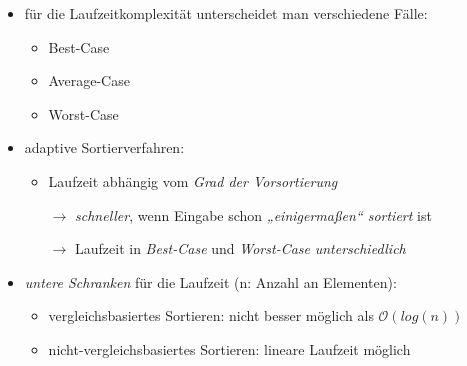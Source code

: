 \documentclass{lehramt-informatik}
\begin{document}
 \cite[Seite 38]{aud:fs:tafeluebung-11}

\begin{itemize}

%

\item für die Laufzeitkomplexität unterscheidet man verschiedene Fälle:

\begin{itemize}
\item Best-Case
\item Average-Case
\item Worst-Case
\end{itemize}

%

\item adaptive Sortierverfahren:

\begin{itemize}
\item Laufzeit abhängig vom \emph{Grad der Vorsortierung}

$\rightarrow$ \emph{schneller}, wenn Eingabe schon \emph{„einigermaßen“
sortiert} ist

$\rightarrow$ Laufzeit in \emph{Best-Case} und \emph{Worst-Case}
\emph{unterschiedlich}

\end{itemize}

%

\item \emph{untere Schranken} für die Laufzeit (n: Anzahl an Elementen):

\begin{itemize}
\item vergleichsbasiertes Sortieren: nicht besser möglich als
$\mathcal{O}(log(n))$
\item nicht-vergleichsbasiertes Sortieren: lineare Laufzeit möglich
\end{itemize}

\end{itemize}

\literatur
\end{document}
